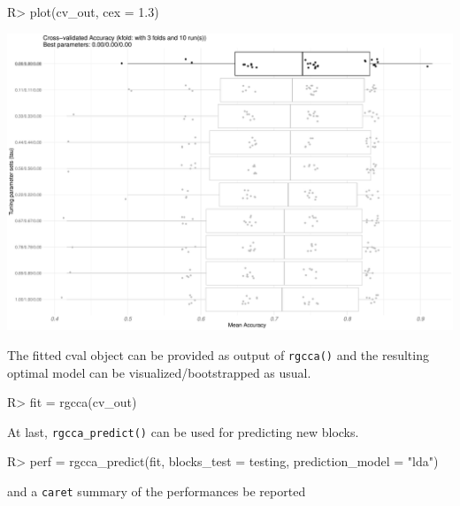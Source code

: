 \documentclass[
]{jss}
\begin{document}
\begin{CodeChunk}
\begin{CodeInput}
R> plot(cv_out, cex = 1.3)
\end{CodeInput}


\begin{center}\includegraphics{RGCCA_vignette_files/figure-latex/unnamed-chunk-28-1} \end{center}

\end{CodeChunk}

\normalsize

The fitted cval object can be provided as output of \texttt{rgcca()} and
the resulting optimal model can be visualized/bootstrapped as usual.

\footnotesize

\begin{CodeChunk}
\begin{CodeInput}
R> fit = rgcca(cv_out)
\end{CodeInput}
\end{CodeChunk}

\normalsize

At last, \texttt{rgcca\_predict()} can be used for predicting new
blocks.

\footnotesize

\begin{CodeChunk}
\begin{CodeInput}
R> perf = rgcca_predict(fit, blocks_test = testing, prediction_model = "lda")
\end{CodeInput}
\end{CodeChunk}

\normalsize

and a \texttt{caret} summary of the performances be reported
\end{document}
